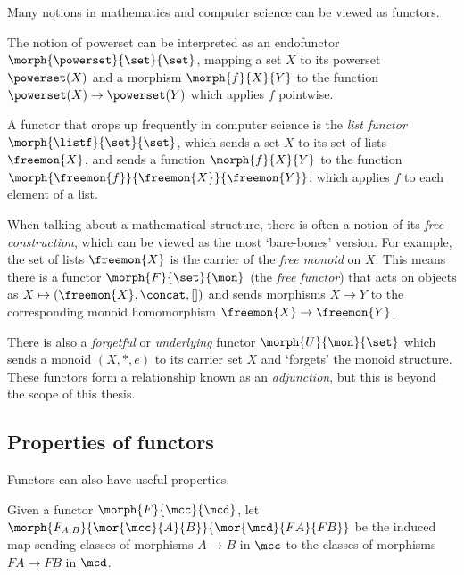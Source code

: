 Many notions in mathematics and computer science can be viewed as functors.

\begin{example}
    The notion of powerset can be interpreted as an endofunctor \(
    \morph{\powerset}{\set}{\set}
    \), mapping a set \(X\) to its powerset \(\powerset(X)\) and a morphism
    \(\morph{f}{X}{Y}\) to the function \(\powerset(X) \to \powerset(Y)\) which
    applies \(f\) pointwise.
\end{example}

\begin{example}\label{ex:list-functor}
    A functor that crops up frequently in computer science is the
    \emph{list functor} \(\morph{\listf}{\set}{\set}\), which sends a set
    \(X\) to its set of lists \(\freemon{X}\), and sends a function
    \(\morph{f}{X}{Y}\) to the function
    \(\morph{\freemon{f}}{\freemon{X}}{\freemon{Y}}\): which applies \(f\)
    to each element of a list.
\end{example}

\begin{example}\label{ex:free-monoid}
    When talking about a mathematical structure, there is often a notion
    of its \emph{free construction}, which can be viewed as the most
    `bare-bones' version.
    For example, the set of lists \(\freemon{X}\) is the carrier of the
    \emph{free monoid} on \(X\).
    This means there is a functor \(\morph{F}{\set}{\mon}\) (the
    \emph{free functor}) that acts on objects as \(
    X \mapsto (\freemon{X}, \concat, [])
    \) and sends morphisms \(X \to Y\) to the corresponding monoid homomorphism
    \(\freemon{X} \to \freemon{Y}\).

    There is also a \emph{forgetful} or \emph{underlying} functor
    \(\morph{U}{\mon}{\set}\) which sends a monoid \((X, *, e)\) to its carrier
    set \(X\) and `forgets' the monoid structure.
    These functors form a relationship known as an \emph{adjunction}, but this
    is beyond the scope of this thesis.
\end{example}

\subsection{Properties of functors}

Functors can also have useful properties.

\begin{notation}
    Given a functor \(\morph{F}{\mcc}{\mcd}\), let \(
    \morph{F_{A,B}}{\mor{\mcc}{A}{B}}{\mor{\mcd}{FA}{FB}}
    \) be the induced map sending classes of morphisms \(A \to B\) in \(\mcc\)
    to the classes of morphisms \(FA \to FB\) in \(\mcd\).
\end{notation}

